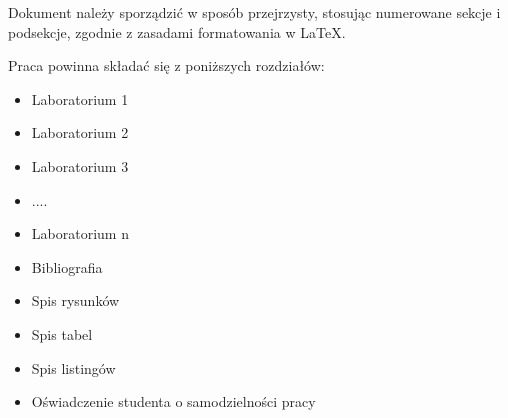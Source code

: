 Dokument należy sporządzić w sposób przejrzysty, stosując numerowane sekcje i podsekcje, zgodnie z zasadami formatowania w \LaTeX.

Praca powinna składać się z poniższych rozdziałów: 
\begin{itemize}
    \item Laboratorium 1
    \item Laboratorium 2
    \item Laboratorium 3
    \item ....
    \item Laboratorium n
    \item Bibliografia
    \item Spis rysunków
    \item Spis tabel
    \item Spis listingów
    \item Oświadczenie studenta o samodzielności pracy 
\end{itemize}





